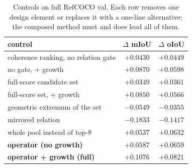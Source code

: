 \begin{table}[t]
\centering
\small
\setlength{\tabcolsep}{4pt}
\caption{Controls on full RefCOCO val. Each row removes one design element or replaces it with a one-line alternative; the composed method must and does lead all of them.}
\label{tab:controls}
\begin{tabular}{@{}lcc@{}}
\toprule
control & $\Delta$ mIoU & $\Delta$ oIoU \\
\midrule
coherence ranking, no relation gate & $+0.0430$ & $+0.0449$ \\
no gate, + growth & $+0.0870$ & $+0.0598$ \\
full-score candidate set & $+0.0349$ & $+0.0361$ \\
full-score set, + growth & $+0.0850$ & $+0.0566$ \\
geometric extremum of the set & $-0.0549$ & $-0.0355$ \\
mirrored relation & $-0.1833$ & $-0.1417$ \\
whole pool instead of top-8 & $+0.0537$ & $+0.0632$ \\
\midrule
\textbf{operator (no growth)} & $\mathbf{+0.0587}$ & $\mathbf{+0.0659}$ \\
\textbf{operator + growth (full)} & $\mathbf{+0.1076}$ & $\mathbf{+0.0821}$ \\
\bottomrule
\end{tabular}
\end{table}
